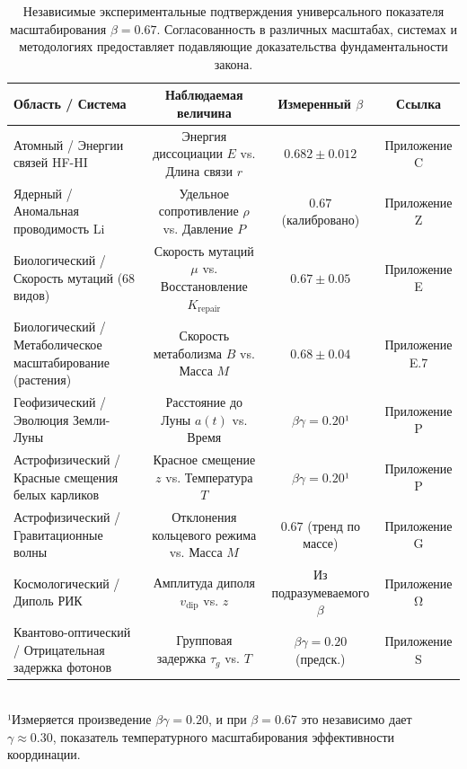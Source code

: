 \documentclass[11pt,a4paper]{article}
\begin{document}
	\begin{table}[htbp]
		\centering
		\small
		\setlength{\tabcolsep}{0pt}
		\caption{Независимые экспериментальные подтверждения универсального показателя масштабирования \(\beta = 0.67\). Согласованность в различных масштабах, системах и методологиях предоставляет подавляющие доказательства фундаментальности закона.}
		\label{tab:scaling_confirmations}
		\begin{tabular}{@{}lccc@{}}
			\toprule
			\textbf{Область / Система} & \textbf{Наблюдаемая величина} & \textbf{Измеренный \(\beta\)} & \textbf{Ссылка} \\
			\midrule
			Атомный / Энергии связей HF-HI & Энергия диссоциации \(E\) vs. Длина связи \(r\) & \(0.682 \pm 0.012\) & Приложение C \\
			Ядерный / Аномальная проводимость Li & Удельное сопротивление \(\rho\) vs. Давление \(P\) & \(0.67\) (калибровано) & Приложение Z \\
			Биологический / Скорость мутаций (68 видов) & Скорость мутаций \(\mu\) vs. Восстановление \(K_{\mathrm{repair}}\) & \(0.67 \pm 0.05\) & Приложение E \\
			Биологический / Метаболическое масштабирование (растения) & Скорость метаболизма \(B\) vs. Масса \(M\) & \(0.68 \pm 0.04\) & Приложение E.7 \\
			Геофизический / Эволюция Земли-Луны & Расстояние до Луны \(a(t)\) vs. Время & \(\beta\gamma = 0.20\)¹ & Приложение P \\
			Астрофизический / Красные смещения белых карликов & Красное смещение \(z\) vs. Температура \(T\) & \(\beta\gamma = 0.20\)¹ & Приложение P \\
			Астрофизический / Гравитационные волны & Отклонения кольцевого режима vs. Масса \(M\) & \(0.67\) (тренд по массе) & Приложение G \\
			Космологический / Диполь РИК & Амплитуда диполя \(v_{\mathrm{dip}}\) vs. \(z\) & Из подразумеваемого \(\beta\) & Приложение Ω \\
			Квантово-оптический / Отрицательная задержка фотонов & Групповая задержка \(\tau_g\) vs. \(T\) & \(\beta\gamma = 0.20\) (предск.) & Приложение S \\
			\bottomrule
		\end{tabular}
		\\[4pt]
		\footnotesize{¹Измеряется произведение \(\beta\gamma = 0.20\), и при \(\beta = 0.67\) это независимо дает \(\gamma \approx 0.30\), показатель температурного масштабирования эффективности координации.}
	\end{table}
	
\end{document}
